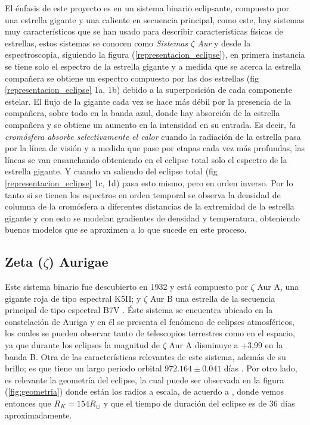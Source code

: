 \documentclass[12pt,oneside,openany,letter]{book}
\begin{document}
\noindent El énfasis de este proyecto es en un sistema binario eclipsante, compuesto por una estrella gigante y una caliente en secuencia principal, como este, hay sistemas muy característicos que se han usado para describir características físicas de estrellas, estos sistemas se conocen como \textit{Sistemas $\zeta$ Aur} \citep{ake2015giants} y desde la espectroscopia, siguiendo la figura (\ref{representacion_eclipse}), en primera instancia se tiene solo el espectro de la estrella gigante y a medida que se acerca la estrella compañera se obtiene un espectro compuesto por las dos estrellas (fig \ref{representacion_eclipse} 1a, 1b) debido a la superposición de cada componente estelar. El flujo de la gigante cada vez se hace más débil por la presencia de la compañera, sobre todo en la banda azul, donde hay absorción de la estrella compañera y se obtiene un aumento en la intensidad en su entrada. Es decir, \textit{la cromósfera absorbe selectivamente el calor} cuando la radiación de la estrella pasa por la línea de visión y a medida que pase por etapas cada vez más profundas, las líneas se van ensanchando obteniendo en el eclipse total solo el espectro de la estrella gigante. Y cuando va saliendo del eclipse total (fig \ref{representacion_eclipse} 1c, 1d) pasa esto mismo, pero en orden inverso. Por lo tanto si se tienen los espectros en orden temporal se observa la densidad de columna de la cromósfera a diferentes distancias de la extremidad de la estrella gigante y con esto se modelan gradientes de densidad y temperatura, obteniendo buenos modelos que se aproximen a lo que sucede en este proceso.

\subsection{Zeta ($\zeta$) Aurigae}

Este sistema binario fue descubierto en 1932 \citep{guthnick1934bevorstehende} y está compuesto por $\zeta$ Aur A, una gigante roja de tipo espectral K5II; y $\zeta$ Aur B una estrella de la secuencia principal de tipo espectral B7V \citep{shenavrin2011vizier}. Éste sistema se encuentra ubicado en la constelación de Auriga  y en él se presenta el fenómeno de eclipses atmosféricos, los cuales se pueden observar tanto de telescopios terrestres como en el espacio, ya que durante los eclipses la magnitud de $\zeta$ Aur A disminuye a +3,99 en la banda B. Otra de las características relevantes de este sistema, además de su brillo; es que tiene un largo periodo orbital $972.164 \pm 0.041$ días \citep{griffin2005spectroscopic}. Por otro lado, es relevante la geometría del eclipse, la cual puede ser observada en la figura (\ref{fig:geometria}) donde están los radios a escala, de acuerdo a \citep{di1990angular}, donde vemos entonces que $R_K = 154 R_\odot$ y que el tiempo de duración del eclipse es de 36 días aproximadamente.
\end{document}
